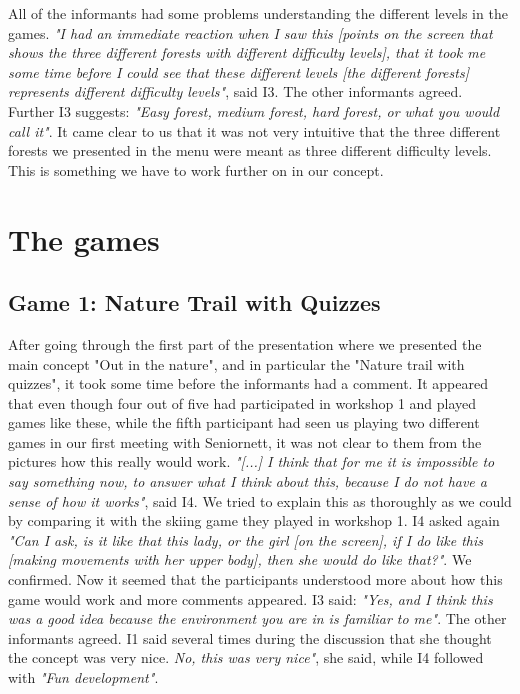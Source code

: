All of the informants had some problems understanding the different levels in the games. \emph{"I had an immediate reaction when I saw this [points on the screen that shows the three different forests with different difficulty levels], that it took me some time before I could see that these different levels [the different forests] represents different difficulty levels"}, said I3. The other informants agreed. Further I3 suggests: \emph{"Easy forest, medium forest, hard forest, or what you would call it"}. It came clear to us that it was not very intuitive that the three different forests we presented in the menu were meant as three different difficulty levels. This is something we have to work further on in our concept. 

\section{The games}

\subsection{Game 1: Nature Trail with Quizzes}

After going through the first part of the presentation where we presented the main concept "Out in the nature", and in particular the "Nature trail with quizzes", it took some time before the informants had a comment. It appeared that even though four out of five had participated in workshop 1 and played games like these, while the fifth participant had seen us playing two different games in our first meeting with Seniornett, it was not clear to them from the pictures how this really would work.  \emph{"[...] I think that for me it is impossible to say something now, to answer what I think about this, because I do not have a sense of how it works"}, said I4.  We tried to explain this as thoroughly as we could by comparing it with the skiing game they played in workshop 1. I4 asked again \emph{"Can I ask, is it like that this lady, or the girl [on the screen], if I do like this [making movements with her upper body], then she would do like that?"}. We confirmed. Now it seemed that the participants understood more about how this game would work and more comments appeared. I3 said: \emph{"Yes, and I think this was a good idea because the environment you are in is familiar to me"}. The other informants agreed. I1 said several times during the discussion that she thought the concept was very nice. \emph{No, this was very nice"}, she said, while I4 followed with \emph{"Fun development"}.  

